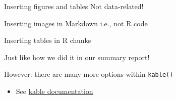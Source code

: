 \documentclass[
  ignorenonframetext,
]{beamer}
\providecommand{\tightlist}{%
  \setlength{\itemsep}{0pt}\setlength{\parskip}{0pt}}
\begin{document}
\begin{frame}[fragile]{Inserting figures and tables \textbar{} Not
data-related!}
\begin{block}{Inserting images in Markdown \textbar{} i.e., not R code}
\end{block}

\begin{block}{Inserting tables in R chunks}

Just like how we did it in our summary report!

However: there are many more options within \texttt{kable()}

\begin{itemize}
\tightlist
\item
  See
  \href{https://cran.r-project.org/web/packages/kableExtra/vignettes/awesome_table_in_html.html}{kable
  documentation}
\end{itemize}

\end{block}

\end{frame}
\end{document}
